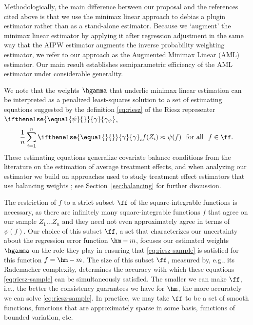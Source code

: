 \documentclass[aos,submission]{imsart}
\theoremstyle{plain}
\theoremstyle{remark}
\newcommand{\riesz}[1][]{\ifthenelse{\equal{#1}{}}{\gamma}{\gamma_{{#1}}}}
\begin{document}
Methodologically, the main difference between our proposal and the references cited above
is that we use the minimax linear approach to debias a plugin estimator \smash{$\psi(\hm)$}
rather than as a stand-alone estimator.
Because we `augment' the minimax linear estimator by applying it after
regression adjustment in the same way that the AIPW estimator
augments the inverse probability weighting estimator, we refer to our
approach as the Augmented Minimax Linear (AML) estimator.
Our main result establishes semiparametric efficiency of the AML estimator
under considerable generality.



We note that the weights $\hgamma$ that underlie minimax linear estimation can be interpreted as a penalized least-squares solution to a set of estimating equations 
suggested by the definition \eqref{eq:riesz} of the Riesz representer $\riesz[\psi]$,
\begin{equation}
\label{eq:riesz-sample}
\frac{1}{n}\sum_{i=1}^n\riesz_i f(Z_i)  \approx \psi(f) \ \text{ for all }\ f \in \ff. 
\end{equation}
These estimating equations generalize covariate balance conditions
from the literature on the estimation of average treatment effects, and 
when analyzing our estimator we build on approaches used to study 
treatment effect estimators that use balancing weights \citep[e.g.,][]{athey2016approximate,graham1,imai2014covariate,kallus2016generalized,zubizarreta2015stable};
see Section~\ref{sec:balancing} for further discussion.

The restriction of $f$ to a strict subset $\ff$ of the square-integrable functions is 
necessary, as there are infinitely many square-integrable functions 
$f$ that agree on our sample $Z_1 \ldots Z_n$ and they need not even approximately agree in terms of $\psi(f)$. 
Our choice of this subset $\ff$, a set that characterizes our uncertainty about the regression error function $\hm - m$, 
focuses our estimated weights $\hgamma$ on the role they play in ensuring that \eqref{eq:riesz-sample} is satisfied for this function $f=\hm - m$. The size of this subset $\ff$, measured by, e.g., its Rademacher complexity, 
determines the accuracy with which these equations \eqref{eq:riesz-sample} can be simultaneously satisfied.
The smaller we can make $\ff$, i.e., the better the consistency guarantees we have for $\hm$, the more accurately we can solve
\eqref{eq:riesz-sample}. In practice, we may take $\ff$ to be a set of smooth functions, functions that are approximately sparse in some basis, 
functions of bounded variation, etc.
\end{document}
